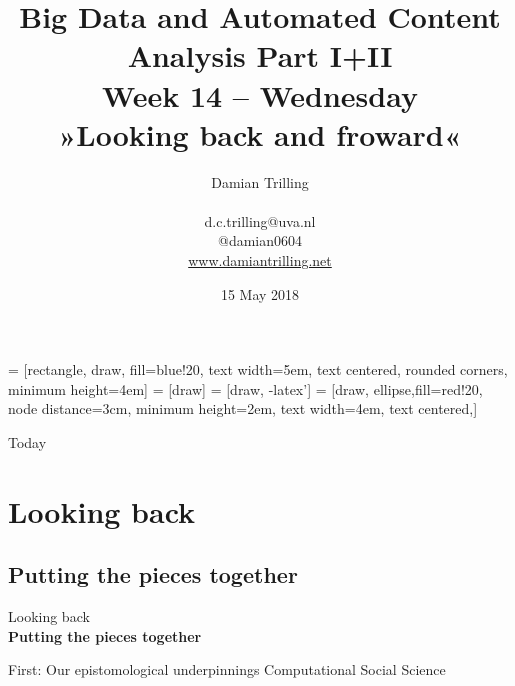 \documentclass{beamer}
\begin{document}
\title[Big Data and Automated Content Analysis]{\textbf{Big Data and Automated Content Analysis Part I+II} \\ Week 14 -- Wednesday \\ »Looking back and froward«}
\author[Damian Trilling]{Damian Trilling \\ ~ \\ \footnotesize{d.c.trilling@uva.nl \\@damian0604} \\ \url{www.damiantrilling.net}}
\date{15 May 2018}




 = [rectangle, draw, fill=blue!20, 
text width=5em, text centered, rounded corners, minimum height=4em]
 = [draw]
 = [draw, -latex']
 = [draw, ellipse,fill=red!20, node distance=3cm,
minimum height=2em, text width=4em, text centered,]

















\begin{frame}{}
\titlepage
\end{frame}

\begin{frame}{Today}
\tableofcontents
\end{frame}




\section{Looking back}
\subsection{Putting the pieces together}
\begin{frame}[plain]{}
Looking back\\
\textbf{Putting the pieces together}
\end{frame}


\begin{frame}{First: Our epistomological underpinnings}
	Computational Social Science
\end{frame}
\end{document}
